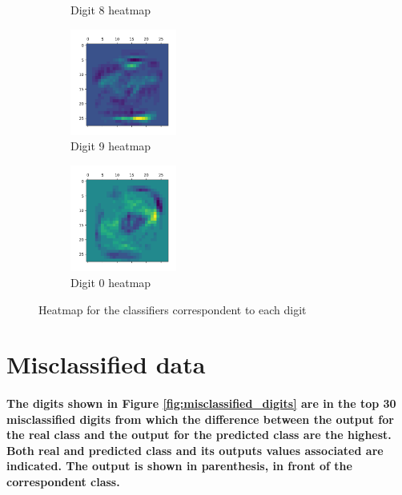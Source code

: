 \documentclass[a4paper]{article}    %
\begin{document}
\begin{figure}[H]
\begin{subfigure}{0.24\textwidth}
        \caption{Digit 8 heatmap}
        \label{fig:digit_8}
    \end{subfigure}
    \hfill
    \begin{subfigure}{0.24\textwidth}
        \centering
        \includegraphics[width=3.5cm]{digit_9}
        \caption{Digit 9 heatmap}
        \label{fig:digit_9}
    \end{subfigure}
    \hfill
    \begin{subfigure}{0.24\textwidth}
        \centering
        \includegraphics[width=3.5cm]{digit_0}
        \caption{Digit 0 heatmap}
        \label{fig:digit_0}
    \end{subfigure}
    \hfill
    \hspace{3.5cm}
    \hfill
    \hspace{3.5cm}
    \caption{Heatmap for the classifiers correspondent to each digit} 
    \label{fig:heatmap_digits}
\end{figure}

\section{Misclassified data}

\paragraph{The digits shown in Figure \ref{fig:misclassified_digits} are in the top 30 misclassified digits from which the difference between the output for the real class and the output for the predicted class are the highest. Both real and predicted class and its outputs values associated are indicated. The output is shown in parenthesis, in front of the correspondent class.}
\end{document}
